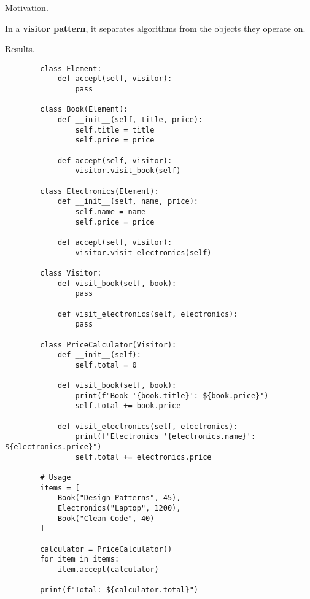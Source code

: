     Motivation. 

    \begin{definition}
      In a \textbf{visitor pattern}, it separates algorithms from the objects they operate on. 
    \end{definition}

    Results. 

    \begin{example}
      \begin{lstlisting}
        class Element:
            def accept(self, visitor):
                pass

        class Book(Element):
            def __init__(self, title, price):
                self.title = title
                self.price = price
            
            def accept(self, visitor):
                visitor.visit_book(self)

        class Electronics(Element):
            def __init__(self, name, price):
                self.name = name
                self.price = price
            
            def accept(self, visitor):
                visitor.visit_electronics(self)

        class Visitor:
            def visit_book(self, book):
                pass
            
            def visit_electronics(self, electronics):
                pass

        class PriceCalculator(Visitor):
            def __init__(self):
                self.total = 0
            
            def visit_book(self, book):
                print(f"Book '{book.title}': ${book.price}")
                self.total += book.price
            
            def visit_electronics(self, electronics):
                print(f"Electronics '{electronics.name}': ${electronics.price}")
                self.total += electronics.price

        # Usage
        items = [
            Book("Design Patterns", 45),
            Electronics("Laptop", 1200),
            Book("Clean Code", 40)
        ]

        calculator = PriceCalculator()
        for item in items:
            item.accept(calculator)

        print(f"Total: ${calculator.total}") 
      \end{lstlisting}
    \end{example}

